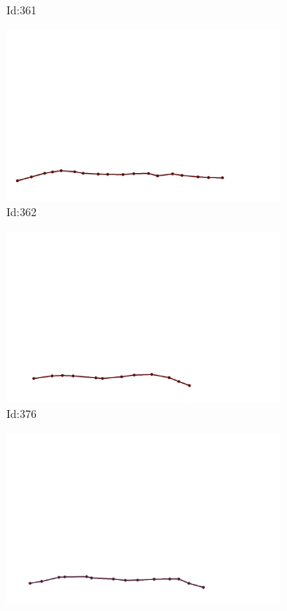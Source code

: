 \documentclass[12pt,twoside]{report}
\begin{document}
\begin{figure}
\begin{subfigure}[b]{0.20\textwidth}
\caption{Id:361}
\end{subfigure}
\begin{subfigure}[b]{0.20\textwidth}
\centering
\includegraphics[width=\textwidth]{../../trajectories/362.png}
\caption{Id:362}
\end{subfigure}
\begin{subfigure}[b]{0.20\textwidth}
\centering
\includegraphics[width=\textwidth]{../../trajectories/376.png}
\caption{Id:376}
\end{subfigure}
\begin{subfigure}[b]{0.20\textwidth}
\centering
\includegraphics[width=\textwidth]{../../trajectories/379.png}

\end{subfigure}
\end{figure}
\end{document}

